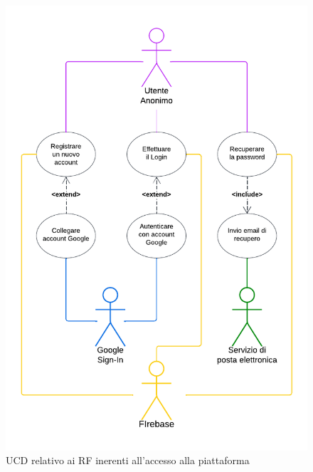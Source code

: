 \documentclass[11pt, a4paper]{article}
\theoremstyle{definition} %
\begin{document}
\begin{figure}[H]
\centering
\includegraphics[scale=0.62]{materiale/ucdiagrams/ucaccesso.pdf}
\caption{UCD relativo ai RF inerenti all'accesso alla piattaforma}
\label{access}
\end{figure}
\end{document}

